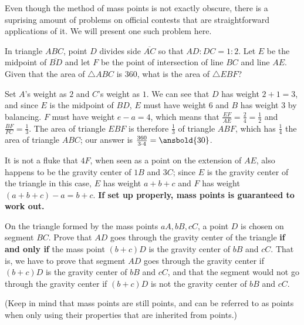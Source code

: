 \documentclass[mast]{lucky}
\begin{document}
\bigskip
Even though the method of mass points is not exactly obscure, there is a suprising amount of problems on official contests that are straightforward applications of it. We will present one such problem here.
\begin{exam}[AMC 8 2019/24]
In triangle $ABC$, point $D$ divides side $\overline{AC}$ so that $AD:DC=1:2$. Let $E$ be the midpoint of $\overline{BD}$ and let $F$ be the point of intersection of line $BC$ and line $AE$. Given that the area of $\triangle ABC$ is $360$, what is the area of $\triangle EBF$?
\end{exam}
\begin{sol}
Set $A$'s weight as $2$ and $C$'s weight as $1$. We can see that $D$ has weight $2+1=3$, and since $E$ is the midpoint of $BD$, $E$ must have weight $6$ and $B$ has weight $3$ by balancing. $F$ must have weight $e-a=4$, which means that $\frac{EF}{AE}=\frac{2}{4}=\frac{1}{2}$ and $\frac{BF}{FC}=\frac{1}{3}$. The area of triangle $EBF$ is therefore $\frac{1}{3}$ of triangle $ABF$, which has $\frac{1}{4}$ the area of triangle $ABC$; our answer is $\frac{360}{3\cdot 4}=\ansbold{30}$.
\end{sol}
\begin{remark}
It is not a fluke that $4F$, when seen as a point on the extension of $AE$, also happens to be the gravity center of $1B$ and $3C$; since $E$ is the gravity center of the triangle in this case, $E$ has weight $a+b+c$ and $F$ has weight $(a+b+c)-a=b+c$. \textbf{If set up properly, mass points is guaranteed to work out.}
\end{remark}
\begin{exer}
On the triangle formed by the mass points $aA,bB,cC$, a point $D$ is chosen on segment $BC$. Prove that $AD$ goes through the gravity center of the triangle \textbf{if and only if} the mass point $(b+c)D$ is the gravity center of $bB$ and $cC$. That is, we have to prove that segment $AD$ goes through the gravity center if $(b+c)D$ is the gravity center of $bB$ and $cC$, and that the segment would not go through the gravity center if $(b+c)D$ is not the gravity center of $bB$ and $cC$.

(Keep in mind that mass points are still points, and can be referred to as points when only using their properties that are inherited from points.)
\end{exer}
\newpage
\end{document}
